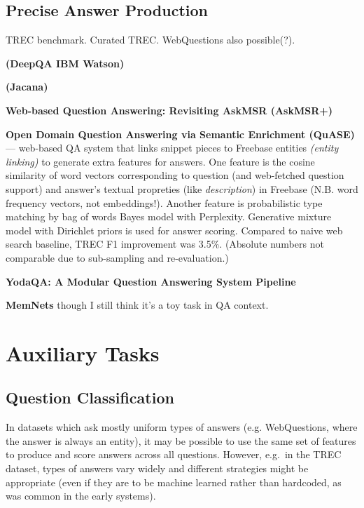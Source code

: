 \subsection{Precise Answer Production}

TREC benchmark.  Curated TREC.  WebQuestions also possible(?).

\textbf{(DeepQA IBM Watson)} \cite{WatsonOverview}

\textbf{(Jacana)} \cite{TreeEdit2013Yao} \cite{TreeEditIR2013Yao}

\textbf{Web-based Question Answering: Revisiting AskMSR (AskMSR+)}

\textbf{Open Domain Question Answering via Semantic Enrichment (QuASE)} \cite{QuASE}
	--- web-based QA system that links snippet pieces to Freebase entities
	\textit{(entity linking)} to generate extra features for answers.
	One feature is the cosine similarity of word
	vectors corresponding to question (and web-fetched question support)
	and answer's textual propreties (like \textit{description}) in Freebase
	(N.B. word frequency vectors, not embeddings!).
	Another feature is probabilistic type matching by bag of words Bayes model
	with Perplexity.  Generative mixture model with Dirichlet priors is used
	for answer scoring.  Compared to naive web search baseline, TREC F1
	improvement was 3.5\%.  (Absolute numbers not comparable due to
	sub-sampling and re-evaluation.)

\textbf{YodaQA: A Modular Question Answering System Pipeline} \cite{YodaQAPoster2015}

\textbf{MemNets} though I still think it's a toy task in QA context.

\section{Auxiliary Tasks}

\subsection{Question Classification}

In datasets which ask mostly uniform types of answers (e.g. WebQuestions,
where the answer is always an entity), it may be possible to use the same
set of features to produce and score answers across all questions.
However, e.g.\ in the TREC dataset, types of answers vary widely and
different strategies might be appropriate (even if they are to be machine
learned rather than hardcoded, as was common in the early systems).

